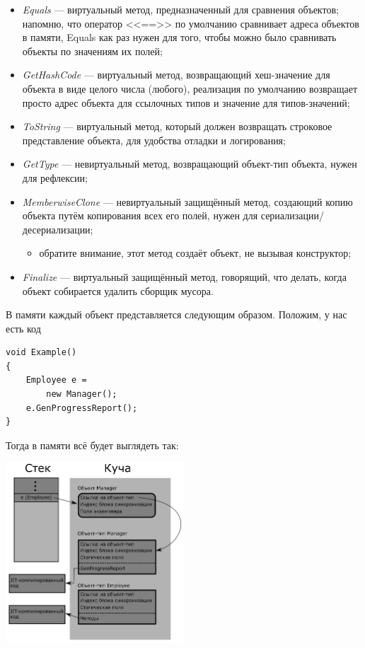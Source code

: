 \documentclass{../../text-style}
\begin{document}
\begin{itemize}
    \item \textit{Equals} --- виртуальный метод, предназначенный для сравнения объектов; напомню, что оператор <<==>> по умолчанию сравнивает адреса объектов в памяти, Equals как раз нужен для того, чтобы можно было сравнивать объекты по значениям их полей;
    \item \textit{GetHashCode} --- виртуальный метод, возвращающий хеш-значение для объекта в виде целого числа (любого), реализация по умолчанию возвращает просто адрес объекта для ссылочных типов и значение для типов-значений;
    \item \textit{ToString} --- виртуальный метод, который должен возвращать строковое представление объекта, для удобства отладки и логирования;
    \item \textit{GetType} --- невиртуальный метод, возвращающий объект-тип объекта, нужен для рефлексии;
    \item \textit{MemberwiseClone} --- невиртуальный защищённый метод, создающий копию объекта путём копирования всех его полей, нужен для сериализации/десериализации;
    \begin{itemize}
        \item обратите внимание, этот метод создаёт объект, не вызывая конструктор;
    \end{itemize}
    \item \textit{Finalize} --- виртуальный защищённый метод, говорящий, что делать, когда объект собирается удалить сборщик мусора.
\end{itemize}

В памяти каждый объект представляется следующим образом. Положим, у нас есть код

\begin{verbatim}
void Example() 
{
    Employee e = 
        new Manager();
    e.GenProgressReport();
}
\end{verbatim}

Тогда в памяти всё будет выглядеть так:

\begin{center}
    \includegraphics[width=0.5\textwidth]{objectInMemory.png}
\end{center}
\end{document}
